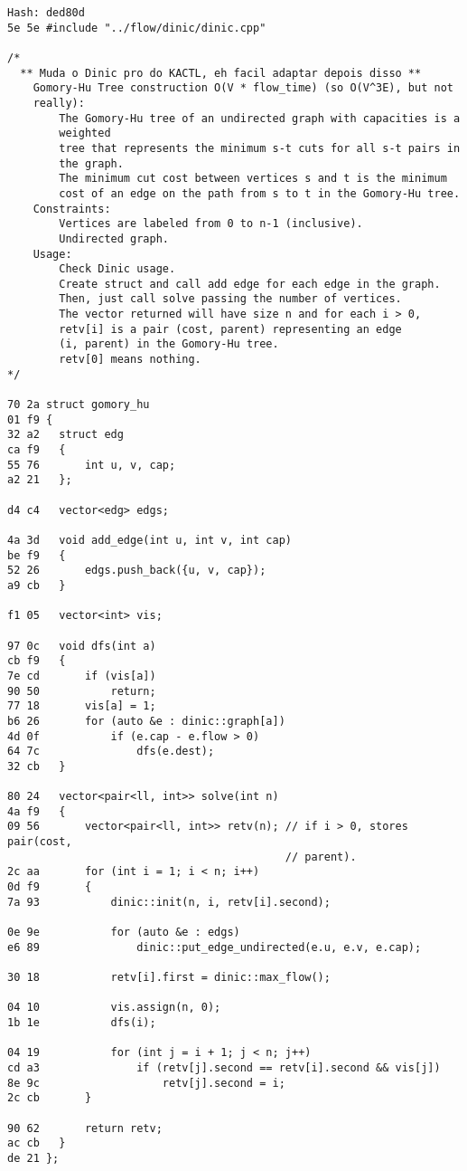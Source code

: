 \documentclass[11pt, a4paper, twoside]{article}
\begin{document}
\begin{lstlisting}
Hash: ded80d
5e 5e #include "../flow/dinic/dinic.cpp"

/*
  ** Muda o Dinic pro do KACTL, eh facil adaptar depois disso ** 
	Gomory-Hu Tree construction O(V * flow_time) (so O(V^3E), but not 
	really):
		The Gomory-Hu tree of an undirected graph with capacities is a 
		weighted
		tree that represents the minimum s-t cuts for all s-t pairs in 
		the graph.
		The minimum cut cost between vertices s and t is the minimum 
		cost of an edge on the path from s to t in the Gomory-Hu tree.
	Constraints:
		Vertices are labeled from 0 to n-1 (inclusive).
		Undirected graph.
	Usage:
		Check Dinic usage.
		Create struct and call add edge for each edge in the graph.
		Then, just call solve passing the number of vertices.
		The vector returned will have size n and for each i > 0,
		retv[i] is a pair (cost, parent) representing an edge 
		(i, parent) in the Gomory-Hu tree.
		retv[0] means nothing.
*/

70 2a struct gomory_hu
01 f9 {
32 a2 	struct edg
ca f9 	{
55 76 		int u, v, cap;
a2 21 	};
      
d4 c4 	vector<edg> edgs;
      
4a 3d 	void add_edge(int u, int v, int cap)
be f9 	{
52 26 		edgs.push_back({u, v, cap});
a9 cb 	}
      
f1 05 	vector<int> vis;
      
97 0c 	void dfs(int a)
cb f9 	{
7e cd 		if (vis[a])
90 50 			return;
77 18 		vis[a] = 1;
b6 26 		for (auto &e : dinic::graph[a])
4d 0f 			if (e.cap - e.flow > 0)
64 7c 				dfs(e.dest);
32 cb 	}
      
80 24 	vector<pair<ll, int>> solve(int n) 
4a f9 	{					   
09 56 		vector<pair<ll, int>> retv(n); // if i > 0, stores pair(cost, 
      									   // parent).
2c aa 		for (int i = 1; i < n; i++)
0d f9 		{
7a 93 			dinic::init(n, i, retv[i].second);
      
0e 9e 			for (auto &e : edgs)
e6 89 				dinic::put_edge_undirected(e.u, e.v, e.cap);
      
30 18 			retv[i].first = dinic::max_flow();
      			
04 10 			vis.assign(n, 0);
1b 1e 			dfs(i);
      
04 19 			for (int j = i + 1; j < n; j++)
cd a3 				if (retv[j].second == retv[i].second && vis[j])
8e 9c 					retv[j].second = i;
2c cb 		}
      
90 62 		return retv;
ac cb 	}
de 21 };
\end{lstlisting}
\end{document}
